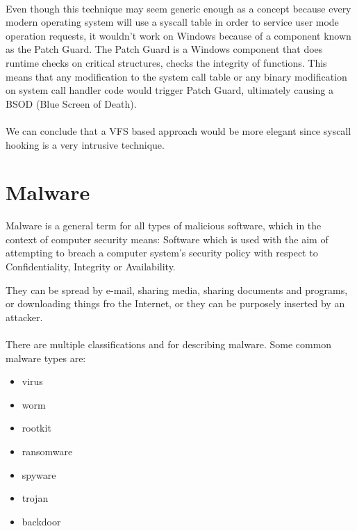 	\paragraph{}
	Even though this technique may seem generic enough as a concept because every modern operating system will use a syscall table in order to service user mode operation requests, it wouldn't work on Windows because of a component known as the Patch Guard. The Patch Guard is a Windows component that does runtime checks on critical structures, checks the integrity of functions. This means that any modification to the system call table or any binary modification on system call handler code would trigger Patch Guard, ultimately causing a BSOD (Blue Screen of Death).

	\paragraph{}
	We can conclude that a VFS based approach would be more elegant since syscall hooking is a very intrusive technique.
	
	\newpage
	\section{Malware}
	Malware is a general term for all types of malicious software, which in the context of
	computer security means: Software which is used with the aim of attempting to breach a computer system’s security policy with respect to Confidentiality, Integrity or Availability\cite{AnIntroductionToMalware}.
	
	They can be spread by e-mail, sharing media, sharing documents and programs, or downloading things fro the Internet, or they can be purposely inserted by an attacker\cite{CISSP}.
	
	\paragraph{}
	There are multiple classifications and for describing malware. Some common malware types are:
	\begin{itemize}
		\item virus
		\item worm
		\item rootkit
		\item ransomware
		\item spyware
		\item trojan
		\item backdoor
	\end{itemize}

